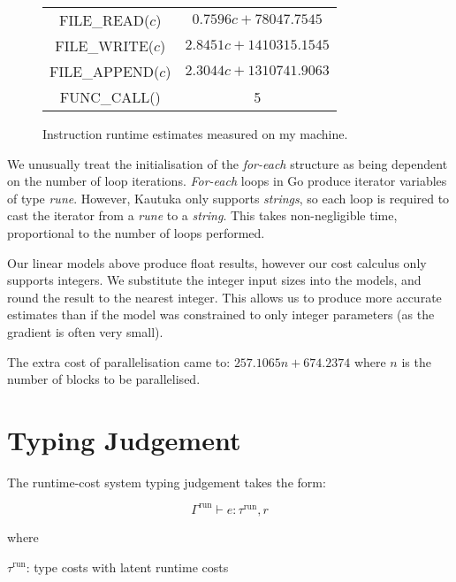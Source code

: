 \begin{figure}[!h]
\begin{tabular}{cc}
    FILE\_READ(\( c \))                  & \( 0.7596c + 78047.7545 \)   \\
    FILE\_WRITE(\( c \))                 & \( 2.8451c + 1410315.1545 \) \\
    FILE\_APPEND(\( c \))                & \( 2.3044c + 1310741.9063 \) \\
    FUNC\_CALL()                         & 5                            \\
  \end{tabular}
  \label{table:runtime}
  \caption{Instruction runtime estimates measured on my machine.}
\end{figure}

\addtocounter{footnote}{-1}

We unusually treat the initialisation of the \textit{for-each} structure as being dependent on the number of loop iterations. \textit{For-each} loops in Go produce iterator variables of type \textit{rune}. However, Kautuka only supports \textit{strings}, so each loop is required to cast the iterator from a \textit{rune} to a \textit{string}. This takes non-negligible time, proportional to the number of loops performed. 

Our linear models above produce float results, however our cost calculus only supports integers. We substitute the integer input sizes into the models, and round the result to the nearest integer. This allows us to produce more accurate estimates than if the model was constrained to only integer parameters (as the gradient is often very small). 

The extra cost of parallelisation came to: \( 257.1065n + 674.2374 \) where \( n \) is the number of blocks to be parallelised.


\section*{Typing Judgement}

The runtime-cost system typing judgement takes the form:

\[ \Gamma^\textrm{run} \vdash e : \tau^\textrm{run}, r \]

where

\vspace{3mm}

\( \tau^\textrm{run} \): type costs with latent runtime costs

